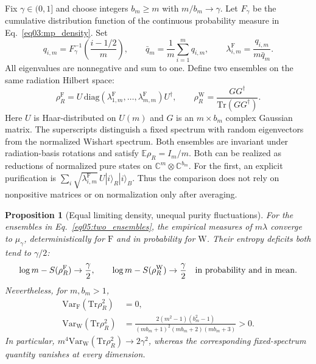 \documentclass[11pt,letterpaper]{article}
\theoremstyle{plain}
\newtheorem{proposition}[theorem]{Proposition}
\theoremstyle{definition}
\theoremstyle{remark}
\begin{document}
Fix $\gamma\in(0,1]$ and choose integers $b_m\geq m$ with
$m/b_m\to\gamma$.  Let $F_\gamma$ be the cumulative distribution
function of the continuous probability measure in
Eq.~\eqref{eq03:mp_density}.  Set
\begin{equation}
\label{eq05:quantile_spectrum}
 q_{i,m}=F_\gamma^{-1}\!\left(\frac{i-1/2}{m}\right),
 \qquad
 \bar q_m=\frac1m\sum_{i=1}^m q_{i,m},
 \qquad
 \lambda_{i,m}^{\mathrm F}=\frac{q_{i,m}}{m\bar q_m}.
\end{equation}
All eigenvalues are nonnegative and sum to one.  Define two ensembles
on the same radiation Hilbert space:
\begin{equation}
\label{eq05:two_ensembles}
 \rho_R^{\mathrm F}
   =U\,\mathrm{diag}(\lambda_{1,m}^{\mathrm F},\ldots,
                     \lambda_{m,m}^{\mathrm F})U^\dagger,
 \qquad
 \rho_R^{\mathrm W}
   =\frac{GG^\dagger}{\mathrm{Tr}(GG^\dagger)}.
\end{equation}
Here $U$ is Haar-distributed on $U(m)$ and $G$ is an $m\times b_m$
complex Gaussian matrix.  The superscripts distinguish a fixed
spectrum with random eigenvectors from the normalized Wishart spectrum.
Both ensembles are invariant under radiation-basis rotations and
satisfy $\mathbb E\rho_R=I_m/m$.  Both can be realized as reductions
of normalized pure states on $\mathbb C^m\otimes\mathbb C^{b_m}$.
For the first, an explicit purification is
$\sum_i\sqrt{\lambda_{i,m}^{\mathrm F}}\,U|i\rangle_R|i\rangle_B$.
Thus the comparison does not rely on nonpositive matrices or on
normalization only after averaging.

\begin{proposition}[Equal limiting density, unequal purity fluctuations]
\label{prop05:spectral_separation}
For the ensembles in Eq.~\eqref{eq05:two_ensembles}, the empirical
measures of $m\lambda$ converge to $\mu_\gamma$, deterministically
for $\mathrm F$ and in probability for $\mathrm W$.  Their entropy
deficits both tend to $\gamma/2$:
\begin{equation}
\label{eq05:matching_entropy}
 \log m-S(\rho_R^{\mathrm F})\to\frac\gamma2,
 \qquad
 \log m-S(\rho_R^{\mathrm W})\to\frac\gamma2
 \quad\hbox{in probability and in mean}.
\end{equation}
Nevertheless, for $m,b_m>1$,
\begin{align}
\label{eq05:fixed_variance}
 \mathrm{Var}_{\mathrm F}(\mathrm{Tr}\rho_R^2)&=0,\\
\label{eq05:haar_purity_variance}
 \mathrm{Var}_{\mathrm W}(\mathrm{Tr}\rho_R^2)
 &=\frac{2(m^2-1)(b_m^2-1)}
 {(mb_m+1)^2(mb_m+2)(mb_m+3)}>0.
\end{align}
In particular, $m^4\mathrm{Var}_{\mathrm W}(\mathrm{Tr}\rho_R^2)
\to2\gamma^2$, whereas the corresponding fixed-spectrum quantity
vanishes at every dimension.
\end{proposition}
\end{document}
